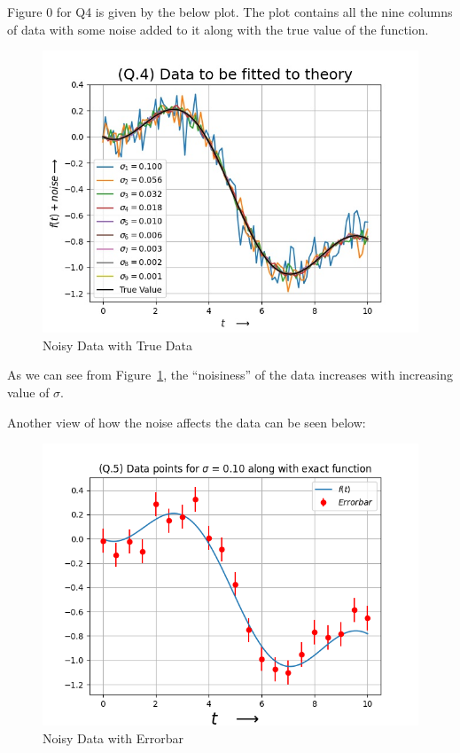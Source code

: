 \documentclass[11pt, a4paper]{article}
\begin{document}
Figure 0 for Q4 is given by the below plot.
The plot contains all the nine columns of data with some noise added to it along with the true value of the function.
  \begin{figure}[!tbh]
   	\centering
   	\includegraphics[scale=0.8]{q4.jpeg} 
   	\caption{Noisy Data with True Data}
   	\label{fig:fig1}
   \end{figure} 

As we can see from Figure~\ref{fig:fig1}, the “noisiness” of the data increases with increasing value of $\sigma$. 

Another view of how the noise affects the data can be seen below: 

  \begin{figure}[!tbh]
   	\centering
   	\includegraphics[scale=0.8]{q5.png}  
   	\caption{Noisy Data with Errorbar}
   	\label{fig:fig2}
   \end{figure} 
   
\end{document}

